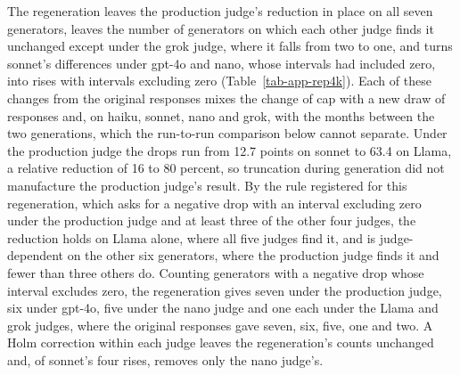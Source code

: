 The regeneration leaves the production judge's
reduction in place on all seven generators, leaves the
number of generators on which each other judge finds it unchanged except under
the grok judge, where it falls from two to one, and turns sonnet's differences
under gpt-4o and nano, whose intervals had included zero, into rises with
intervals excluding zero (Table~\ref{tab-app-rep4k}).
Each of these changes from the original responses mixes the change of cap
with a new draw of responses and, on haiku, sonnet, nano and grok, with the
months between the two generations, which the run-to-run comparison below
cannot separate.
Under the
production judge the drops run from 12.7 points on sonnet to 63.4 on Llama,
a relative reduction of 16 to 80 percent, so truncation during generation did not
manufacture the production judge's result.
By the rule registered for this regeneration, which asks for a negative drop
with an interval excluding zero under the production judge and at least three
of the other four judges, the reduction holds on Llama alone, where all five
judges find it, and is judge-dependent on the other six generators, where the
production judge finds it and fewer than three others do.
Counting generators with a negative drop whose interval excludes zero, the
regeneration gives seven under the production judge, six under gpt-4o, five
under the nano judge and one each under the Llama and grok judges, where the
original responses gave seven, six, five, one and two.
A Holm correction within each judge leaves the regeneration's counts unchanged
and, of sonnet's four rises, removes only the nano judge's.

